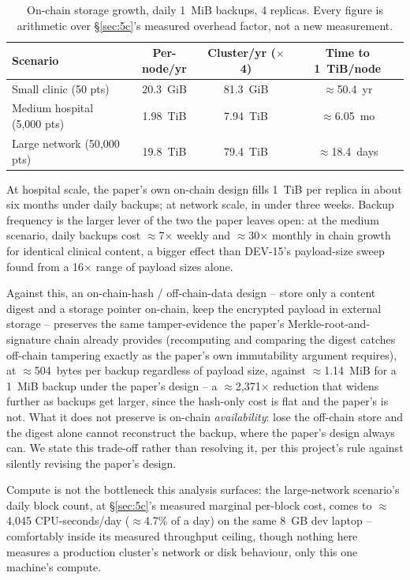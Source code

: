 \documentclass[conference]{IEEEtran}
\begin{document}
\begin{table}[t]
\centering
\caption{On-chain storage growth, daily 1~MiB backups, 4 replicas. Every figure is arithmetic
over \S\ref{sec:5c}'s measured overhead factor, not a new measurement.}
\label{tab:storage}
\footnotesize
\begin{tabular}{lccc}
\hline
\textbf{Scenario} & \textbf{Per-node/yr} & \textbf{Cluster/yr ($\times$4)} & \textbf{Time to 1~TiB/node} \\
\hline
Small clinic (50 pts) & 20.3~GiB & 81.3~GiB & $\approx$50.4~yr \\
Medium hospital (5{,}000 pts) & 1.98~TiB & 7.94~TiB & $\approx$6.05~mo \\
Large network (50{,}000 pts) & 19.8~TiB & 79.4~TiB & $\approx$18.4~days \\
\hline
\end{tabular}
\end{table}

At hospital scale, the paper's own on-chain design fills 1~TiB per replica in about six months
under daily backups; at network scale, in under three weeks. Backup frequency is the larger lever
of the two the paper leaves open: at the medium scenario, daily backups cost $\approx$7$\times$
weekly and $\approx$30$\times$ monthly in chain growth for identical clinical content, a bigger
effect than DEV-15's payload-size sweep found from a 16$\times$ range of payload sizes alone.

Against this, an on-chain-hash / off-chain-data design -- store only a content digest and a
storage pointer on-chain, keep the encrypted payload in external storage -- preserves the same
tamper-evidence the paper's Merkle-root-and-signature chain already provides (recomputing and
comparing the digest catches off-chain tampering exactly as the paper's own immutability argument
requires), at $\approx$504~bytes per backup regardless of payload size, against
$\approx$1.14~MiB for a 1~MiB backup under the paper's design -- a $\approx$2{,}371$\times$
reduction that widens further as backups get larger, since the hash-only cost is flat and the
paper's is not. What it does not preserve is on-chain \emph{availability}: lose the off-chain
store and the digest alone cannot reconstruct the backup, where the paper's design always can.
We state this trade-off rather than resolving it, per this project's rule against silently
revising the paper's design.

Compute is not the bottleneck this analysis surfaces: the large-network scenario's daily block
count, at \S\ref{sec:5c}'s measured marginal per-block cost, comes to $\approx$4{,}045
CPU-seconds/day ($\approx$4.7\% of a day) on the same 8~GB dev laptop -- comfortably inside its
measured throughput ceiling, though nothing here measures a production cluster's network or disk
behaviour, only this one machine's compute.
\end{document}
